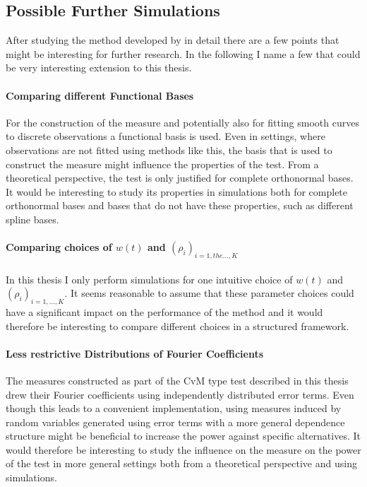 \documentclass[12pt, a4paper]{article}
\theoremstyle{MAstyle} \newtheorem{assumption}{Assumption}[section]
\theoremstyle{MAstyle} \newtheorem{definition}{Definition}[section]
\theoremstyle{MAstyle} \newtheorem{theorem}{Theorem}[section]
\begin{document}
		\subsection{Possible Further Simulations}
			After studying the method developed by \cite{bugni_permutation_2021} in detail there are a few points that might be interesting for further research. In the following I name a few that could be very interesting extension to this thesis.
			
			\paragraph{Comparing different Functional Bases\\} 
			For the construction of the measure and potentially also for fitting smooth curves to discrete observations a functional basis is used. Even in settings, where observations are not fitted using methods like this, the basis that is used to construct the measure might influence the properties of the test. From a theoretical perspective, the test is only justified for complete orthonormal bases. It would be interesting to study its properties in simulations both for complete orthonormal bases and bases that do not have these properties, such as different spline bases.
		
			\paragraph{Comparing choices of $w(t)$ and  $\left(\rho_i\right)_{i = 1, the \dots, K}$\\}
			In this thesis I only perform simulations for one intuitive choice of $w(t)$ and $\left(\rho_i\right)_{i = 1, \dots, K}$. It seems reasonable to assume that these parameter choices could have a significant impact on the performance of the method and it would therefore be interesting to compare different choices in a structured framework.
			
			\paragraph{Less restrictive Distributions of Fourier Coefficients\\}
			The measures constructed as part of the CvM type test described in this thesis drew their Fourier coefficients using independently distributed error terms. Even though this leads to a convenient implementation, using measures induced by random variables generated using error terms with a more general dependence structure might be beneficial to increase the power against specific alternatives. It would therefore be interesting to study the influence on the measure on the power of the test in more general settings both from a theoretical perspective and using simulations. 
		
\end{document}
